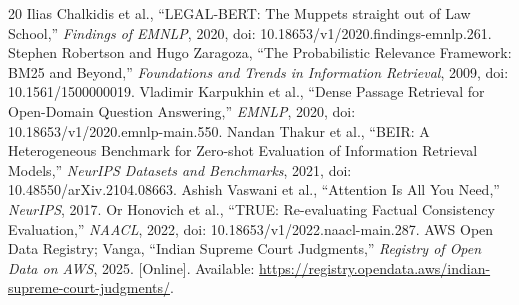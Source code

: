 \begin{thebibliography}{20}
 Ilias Chalkidis et al., ``LEGAL-BERT: The Muppets straight out of Law School,'' \emph{Findings of EMNLP}, 2020, doi: 10.18653/v1/2020.findings-emnlp.261.
 Stephen Robertson and Hugo Zaragoza, ``The Probabilistic Relevance Framework: BM25 and Beyond,'' \emph{Foundations and Trends in Information Retrieval}, 2009, doi: 10.1561/1500000019.
 Vladimir Karpukhin et al., ``Dense Passage Retrieval for Open-Domain Question Answering,'' \emph{EMNLP}, 2020, doi: 10.18653/v1/2020.emnlp-main.550.
 Nandan Thakur et al., ``BEIR: A Heterogeneous Benchmark for Zero-shot Evaluation of Information Retrieval Models,'' \emph{NeurIPS Datasets and Benchmarks}, 2021, doi: 10.48550/arXiv.2104.08663.
 Ashish Vaswani et al., ``Attention Is All You Need,'' \emph{NeurIPS}, 2017.
 Or Honovich et al., ``TRUE: Re-evaluating Factual Consistency Evaluation,'' \emph{NAACL}, 2022, doi: 10.18653/v1/2022.naacl-main.287.
 AWS Open Data Registry; Vanga, ``Indian Supreme Court Judgments,'' \emph{Registry of Open Data on AWS}, 2025. [Online]. Available: \url{https://registry.opendata.aws/indian-supreme-court-judgments/}.
\end{thebibliography}
